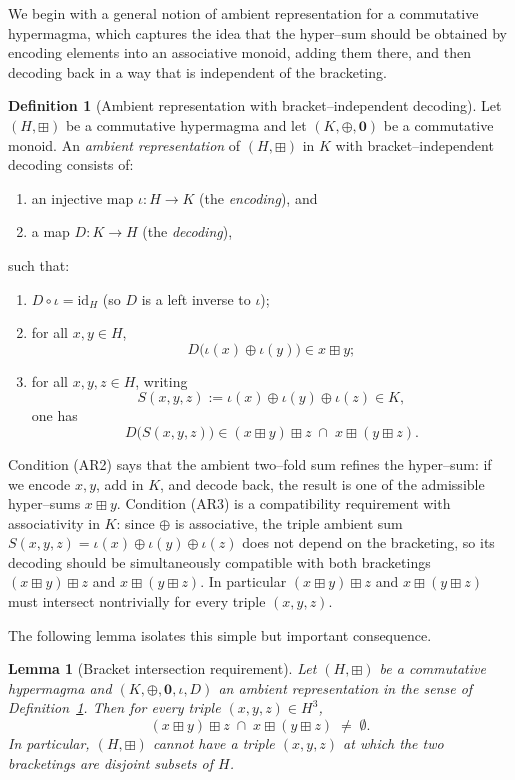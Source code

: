 \documentclass[11pt]{amsart}
\numberwithin{equation}{section}
\newtheorem{lemma}[theorem]{Lemma}
\theoremstyle{definition}
\newtheorem{definition}[theorem]{Definition}
\theoremstyle{remark}
\begin{document}
We begin with a general notion of ambient representation for a
commutative hypermagma, which captures the idea that the hyper–sum
should be obtained by encoding elements into an associative monoid,
adding them there, and then decoding back in a way that is independent
of the bracketing.

\begin{definition}[Ambient representation with bracket–independent decoding]
\label{def:ambient-representation}
Let $(H,\boxplus)$ be a commutative hypermagma and let
$(K,\oplus,\mathbf{0})$ be a commutative monoid.  An
\emph{ambient representation} of $(H,\boxplus)$ in $K$ with
bracket–independent decoding consists of:
\begin{enumerate}
  \item an injective map $\iota:H\to K$ (the \emph{encoding}), and
  \item a map $D:K\to H$ (the \emph{decoding}),
\end{enumerate}
such that:
\begin{enumerate}
  \item[(AR1)] $D\circ\iota = \mathrm{id}_H$ (so $D$ is a left inverse
               to $\iota$);
  \item[(AR2)] for all $x,y\in H$,
  \[
    D\bigl(\iota(x)\oplus\iota(y)\bigr)
    \in x\boxplus y;
  \]
  \item[(AR3)] for all $x,y,z\in H$, writing
  \[
    S(x,y,z) := \iota(x)\oplus\iota(y)\oplus\iota(z)\in K,
  \]
  one has
  \[
    D\bigl(S(x,y,z)\bigr)
    \in (x\boxplus y)\boxplus z
       \;\cap\;
       x\boxplus(y\boxplus z).
  \]
\end{enumerate}
\end{definition}

Condition (AR2) says that the ambient two–fold sum refines the
hyper–sum: if we encode $x,y$, add in $K$, and decode back, the result
is one of the admissible hyper–sums $x\boxplus y$.  Condition (AR3)
is a compatibility requirement with associativity in $K$: since
$\oplus$ is associative, the triple ambient sum
$S(x,y,z)=\iota(x)\oplus\iota(y)\oplus\iota(z)$ does not depend on the
bracketing, so its decoding should be simultaneously compatible with
both bracketings $(x\boxplus y)\boxplus z$ and $x\boxplus(y\boxplus
z)$.  In particular $(x\boxplus y)\boxplus z$ and $x\boxplus(y\boxplus
z)$ must intersect nontrivially for every triple $(x,y,z)$.

The following lemma isolates this simple but important consequence.

\begin{lemma}[Bracket intersection requirement]
\label{lem:ambient-bracket-intersection}
Let $(H,\boxplus)$ be a commutative hypermagma and
$(K,\oplus,\mathbf{0},\iota,D)$ an ambient representation in the sense
of Definition~\ref{def:ambient-representation}.  Then for every triple
$(x,y,z)\in H^3$,
\[
  (x\boxplus y)\boxplus z
  \;\cap\;
  x\boxplus(y\boxplus z)
  \;\neq\;\emptyset.
\]
In particular, $(H,\boxplus)$ cannot have a triple $(x,y,z)$ at which
the two bracketings are disjoint subsets of $H$.
\end{lemma}
\end{document}
